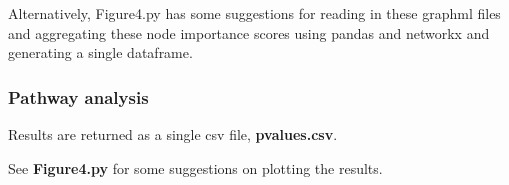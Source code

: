 \documentclass[]{article}
\begin{document}
Alternatively, Figure4.py has some suggestions for reading in these
graphml files and aggregating these node importance scores using pandas
and networkx and generating a single dataframe.

\hypertarget{pathway-analysis}{%
\subsubsection{Pathway analysis}\label{pathway-analysis}}

Results are returned as a single csv file, \textbf{pvalues.csv}.

See \textbf{Figure4.py} for some suggestions on plotting the results.
\end{document}
